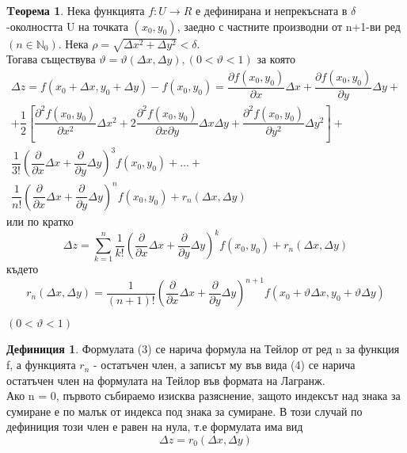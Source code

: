 \documentclass[a4paper,fleqn,12pt]{article}
\theoremstyle{definition}
\newtheorem{theorem}{Tеорема}[subsection]
\newtheorem{definition}{Дефиниция}[subsection]
\begin{document}
\begin{theorem}
Нека функцията $f: U \to R$ е дефинирана и непрекъсната в $\delta$-околността U на точката $(x_0,y_0)$, заедно с частните производни от n+1-ви ред $(n \in \mathbb{N}_0)$. Нека $\rho = \sqrt{\Delta x^2 + \Delta y^2} < \delta$. \\
Тогава съществува $\vartheta = \vartheta(\Delta x, \Delta y),  (0 < \vartheta < 1)$ за която
\begin{gather*}
\Delta z = f(x_0 + \Delta x, y_0 + \Delta y) - f(x_0, y_0) = \dfrac{\partial f(x_0, y_0) }{\partial x} \Delta x + \dfrac{\partial f(x_0, y_0) }{\partial y} \Delta y + \\
+ \dfrac{1}{2} \left[ \dfrac{\partial^2 f(x_0, y_0) }{\partial x^2} \Delta x^2 + 2\dfrac{\partial^2 f(x_0, y_0) }{\partial x \partial y}\Delta x \Delta y +  \dfrac{\partial^2 f(x_0, y_0) }{\partial y^2} \Delta y^2 \right] + \\
\dfrac{1}{3!} \left(\dfrac{\partial}{\partial x} \Delta x+ \dfrac{\partial}{\partial y} \Delta y \right)^3 f(x_0, y_0) + ... + \\
\dfrac{1}{n!} \left(\dfrac{\partial}{\partial x} \Delta x+ \dfrac{\partial}{\partial y} \Delta y \right)^n f(x_0, y_0) + r_n(\Delta x, \Delta y) 
\end{gather*}
или по кратко
\begin{equation}
\Delta z = \sum_{k=1} ^n \dfrac{1}{k!} \left(\dfrac{\partial}{\partial x} \Delta x+ \dfrac{\partial}{\partial y} \Delta y \right)^k f(x_0, y_0) + r_n(\Delta x, \Delta y) 
\end{equation}
където 
\begin{equation}
r_n(\Delta x, \Delta y) = \dfrac{1}{(n+1)!} \left(\dfrac{\partial}{\partial x} \Delta x+ \dfrac{\partial}{\partial y} \Delta y \right)^{n+1} f(x_0 + \vartheta \Delta x,  y_0 + \vartheta \Delta y)
\end{equation}
\centerline{$(0 < \vartheta < 1)$}
\end{theorem}

\begin{definition}
Формулата (3) се нарича формула на Тейлор от ред n за функция f, а функцията $r_n$ - остатъчен член, а записът му във вида (4) се нарича остатъчен член на формулата на Тейлор във формата на Лагранж. \\
Ако n = 0, първото събираемо изисква разяснение, защото индексът над знака за сумиране е по малък от индекса под знака за сумиране. В този случай  по дефиниция този член е равен на нула, т.е формулата има вид
$$\Delta z = r_0 (\Delta x, \Delta y)$$
\end{definition}
\end{document}
